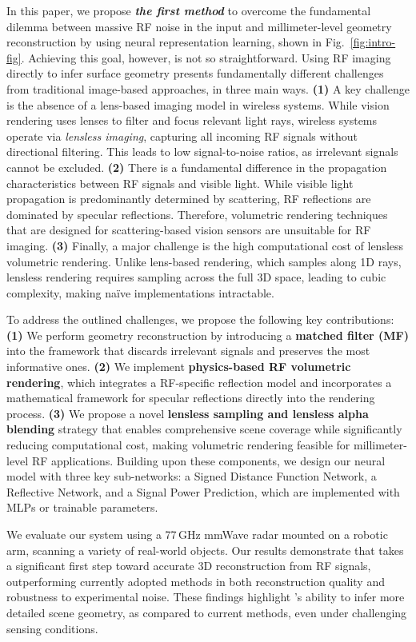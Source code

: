 In this paper, we propose {\bf\em the first method} to overcome the fundamental dilemma between massive RF noise in the input and millimeter-level geometry reconstruction by using neural representation learning, shown in Fig.~\ref{fig:intro-fig}.
Achieving this goal, however, is not so straightforward. Using RF imaging directly to infer surface geometry
presents fundamentally different challenges from traditional image-based approaches, in three main ways.
\textbf{(1)} A key challenge is the absence of a lens-based imaging model in wireless systems.  
While vision rendering uses lenses to filter and focus relevant light rays, wireless systems operate via \textit{lensless imaging}, capturing all incoming RF signals without directional filtering.  
This leads to low signal-to-noise ratios, as irrelevant signals cannot be excluded.
\textbf{(2)} There is a fundamental difference in the propagation characteristics between RF signals and visible light.  
While visible light propagation is predominantly determined by scattering, RF reflections are dominated by specular reflections.  
Therefore, volumetric rendering techniques that are designed for scattering-based vision sensors are unsuitable for RF imaging.
\textbf{(3)} Finally, a major challenge is the high computational cost of lensless volumetric rendering.  
Unlike lens-based rendering, which samples along 1D rays, lensless rendering requires sampling across the full 3D space, leading to cubic complexity, making naïve implementations intractable.


To address the outlined challenges, we propose the following key contributions:
\textbf{(1)} We perform geometry reconstruction by introducing a {\bf matched filter (MF)} into the 
framework that discards irrelevant signals and preserves the most informative ones.  
\textbf{(2)} We implement {\bf physics-based RF volumetric rendering}, which integrates a RF-specific 
reflection model and incorporates a mathematical framework for specular reflections directly into the 
rendering process.
\textbf{(3)} We propose a novel {\bf lensless sampling and lensless alpha blending} strategy that enables comprehensive scene 
coverage while significantly reducing computational cost, making volumetric rendering feasible for millimeter-level RF applications.
Building upon these components, we design our neural model with three key sub-networks: a Signed Distance Function Network, a Reflective Network, and a Signal Power Prediction, which are implemented with MLPs or trainable parameters.

We evaluate our system using a 77\,GHz mmWave radar mounted on a robotic arm, scanning a variety of real-world objects.  
Our results demonstrate that \name{} takes a significant first step toward accurate 3D reconstruction from RF signals, outperforming currently adopted methods in both reconstruction quality and robustness to experimental noise.  
These findings highlight \name{}'s ability to infer more detailed scene geometry, as compared to current methods, even under challenging sensing conditions.